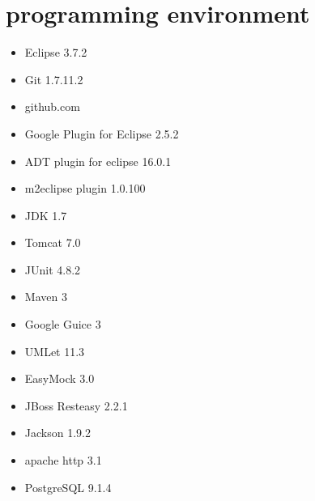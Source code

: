 \section{programming environment}\label{sec:programmingenvironment}

\begin{itemize}

\item Eclipse 3.7.2

\item Git 1.7.11.2

\item github.com

\item Google Plugin for Eclipse 2.5.2

\item ADT plugin for eclipse 16.0.1

\item m2eclipse plugin 1.0.100

\item JDK 1.7

\item Tomcat 7.0

\item JUnit 4.8.2

\item Maven 3

\item Google Guice 3

\item UMLet 11.3

\item EasyMock 3.0

\item JBoss Resteasy 2.2.1

\item Jackson 1.9.2

\item apache http 3.1

\item PostgreSQL 9.1.4

\end{itemize}